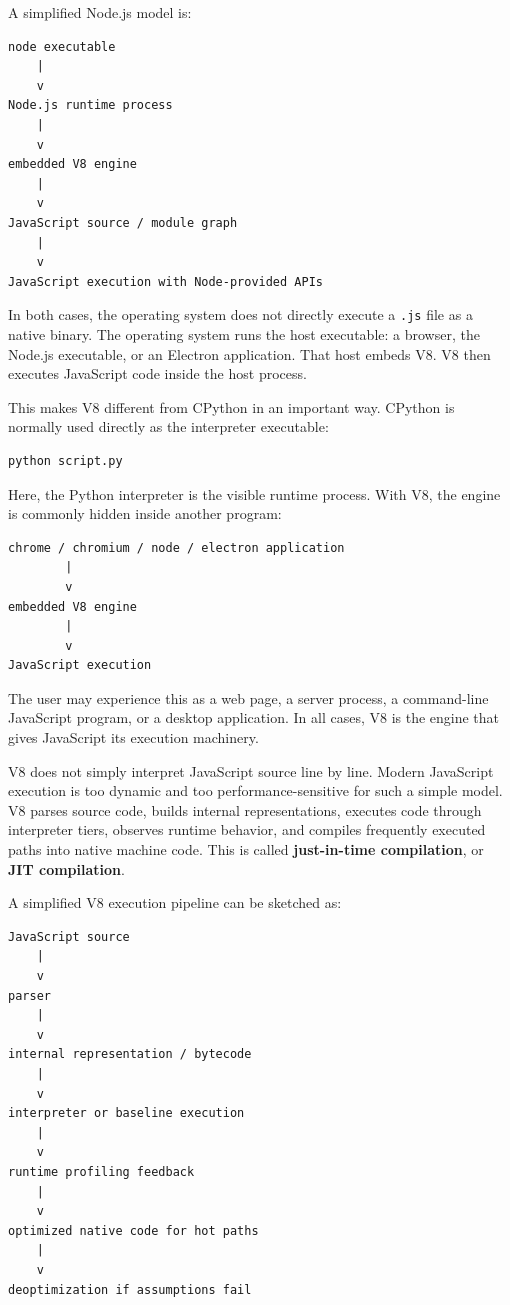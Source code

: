 A simplified Node.js model is:

\begin{verbatim}
node executable
    |
    v
Node.js runtime process
    |
    v
embedded V8 engine
    |
    v
JavaScript source / module graph
    |
    v
JavaScript execution with Node-provided APIs
\end{verbatim}

In both cases, the operating system does not directly execute a \texttt{.js} file as a native binary. The operating system runs the host executable: a browser, the Node.js executable, or an Electron application. That host embeds V8. V8 then executes JavaScript code inside the host process.

This makes V8 different from CPython in an important way. CPython is normally used directly as the interpreter executable:

\begin{verbatim}
python script.py
\end{verbatim}

Here, the Python interpreter is the visible runtime process. With V8, the engine is commonly hidden inside another program:

\begin{verbatim}
chrome / chromium / node / electron application
        |
        v
embedded V8 engine
        |
        v
JavaScript execution
\end{verbatim}

The user may experience this as a web page, a server process, a command-line JavaScript program, or a desktop application. In all cases, V8 is the engine that gives JavaScript its execution machinery.

V8 does not simply interpret JavaScript source line by line. Modern JavaScript execution is too dynamic and too performance-sensitive for such a simple model. V8 parses source code, builds internal representations, executes code through interpreter tiers, observes runtime behavior, and compiles frequently executed paths into native machine code. This is called \textbf{just-in-time compilation}, or \textbf{JIT compilation}.

A simplified V8 execution pipeline can be sketched as:

\begin{verbatim}
JavaScript source
    |
    v
parser
    |
    v
internal representation / bytecode
    |
    v
interpreter or baseline execution
    |
    v
runtime profiling feedback
    |
    v
optimized native code for hot paths
    |
    v
deoptimization if assumptions fail
\end{verbatim}

